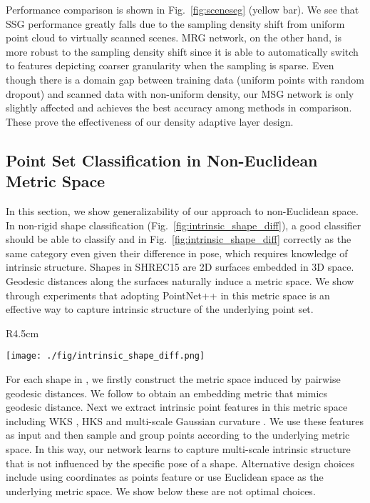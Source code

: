 \documentclass{article}
\begin{document}
Performance comparison is shown in Fig.~\ref{fig:sceneseg} (yellow bar). We see that SSG performance greatly falls due to the sampling density shift from uniform point cloud to virtually scanned scenes. MRG network, on the other hand, is more robust to the sampling density shift since it is able to automatically switch to features depicting coarser granularity when the sampling is sparse. Even though there is a domain gap between training data (uniform points with random dropout) and scanned data with non-uniform density, our MSG network is only slightly affected and achieves the best accuracy among methods in comparison. These prove the effectiveness of our density adaptive layer design.






\vspace{-0.3cm}
\subsection{Point Set Classification in Non-Euclidean Metric Space}

In this section, we show generalizability of our approach to non-Euclidean space. In non-rigid shape classification (Fig.~\ref{fig:intrinsic_shape_diff}), a good classifier should be able to classify  and  in Fig.~\ref{fig:intrinsic_shape_diff} correctly as the same category even given their difference in pose, which requires knowledge of intrinsic structure.
Shapes in SHREC15 are 2D surfaces embedded in 3D space. Geodesic distances along the surfaces naturally induce a metric space. We show through experiments that adopting PointNet++ in this metric space is an effective way to capture intrinsic structure of the underlying point set.

\begin{wrapfigure}{R}{4.5cm}
  \vspace{-15pt}
  \begin{center}
    \texttt{[image: ./fig/intrinsic\_shape\_diff.png]}
  \end{center}  \vspace{-15pt}
  \caption{An example of non-rigid shape classification.}
  \label{fig:intrinsic_shape_diff}
\end{wrapfigure}

For each shape in \cite{3dor.20151064}, we firstly construct the metric space induced by pairwise geodesic distances. We follow \cite{rustamov2009interior} to obtain an embedding metric that mimics geodesic distance. Next we extract intrinsic point features in this metric space including WKS \cite{aubry2011wave}, HKS \cite{sun2009concise} and multi-scale Gaussian curvature \cite{meyer2002discrete}. We use these features as input and then sample and group points according to the underlying metric space. In this way, our network learns to capture multi-scale intrinsic structure that is not influenced by the specific pose of a shape. Alternative design choices include using  coordinates as points feature or use Euclidean space  as the underlying metric space. We show below these are not optimal choices.
\end{document}

